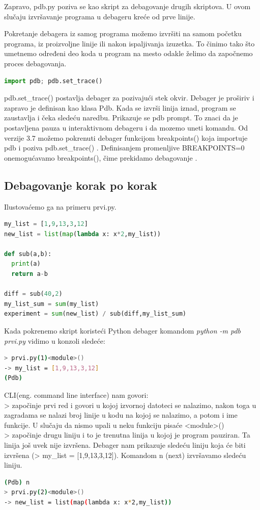 \documentclass[a4paper]{article}
\begin{document}
Zapravo, pdb.py poziva se kao skript za debagovanje drugih skriptova. U ovom slučaju izvršavanje programa u debageru kreće od prve linije.

Pokretanje debagera iz samog programa možemo izvršiti na samom početku programa, iz proizvoljne linije ili nakon ispaljivanja izuzetka. To činimo tako što umetnemo određeni deo koda u program na mesto odakle želimo da započnemo proces debagovanja.
\begin{lstlisting}[language = python, caption = {Započinjemo debagovanje}]
import pdb; pdb.set_trace()
\end{lstlisting}

pdb.set\_trace() postavlja debager za pozivajući stek okvir. Debager je proširiv i zapravo je definisan kao klasa Pdb. Kada se izvrši linija iznad, program se zaustavlja i čeka sledeću naredbu. Prikazuje se pdb prompt. To znaci da je postavljena pauza u interaktivnom debageru i da mozemo uneti komandu.
Od verzije 3.7 možemo pokrenuti debager funkcijom breakpoints() koja importuje pdb i poziva pdb.set\_trace() \cite{pdbExamples}. Definisanjem promenljive BREAKPOINTS=0 onemogućavamo breakpoints(), čime prekidamo debagovanje \cite{pdbExamples}.
\subsection{Debagovanje korak po korak}
Ilustovaćemo ga na primeru prvi.py.
\begin{lstlisting}[language = python, caption = {Primer za ilustrovanje narednih komandi (prvi.py)}]
my_list = [1,9,13,3,12]
new_list = list(map(lambda x: x*2,my_list))

def sub(a,b):
  print(a)
  return a-b
  
diff = sub(40,2)
my_list_sum = sum(my_list)
experiment = sum(new_list) / sub(diff,my_list_sum)
\end{lstlisting}

Kada pokrenemo skript koristeći Python debager komandom \emph{python -m pdb prvi.py} vidimo u konzoli sledeće:
\begin{lstlisting}[language = bash, caption={Ulazak u Pdb prompt}]
> prvi.py(1)<module>()
-> my_list = [1,9,13,3,12]
(Pdb)
\end{lstlisting}
CLI(eng. command line interface) nam govori:\\
> započinje prvi red i govori u kojoj izvornoj datoteci se nalazimo, nakon toga u zagradama se nalazi broj linije u kodu na kojoj se nalazimo, a potom i ime funkcije. U slučaju da nismo upali u neku funkciju pisaće <module>()\\
\textendash>  započinje drugu liniju i to je trenutna linija u kojoj je program pauziran. Ta linija još uvek nije izvršena. Debager nam prikazuje sledeću liniju koja će biti izvršena 
(\textendash> my\_list = [1,9,13,3,12]).
Komandom n (next) izvršavamo sledeću liniju.
\begin{lstlisting}[language = bash, caption={Izvršavanje prve linije k\^{o}da}]
(Pdb) n
> prvi.py(2)<module>()
-> new_list = list(map(lambda x: x*2,my_list))
\end{lstlisting}
\end{document}
